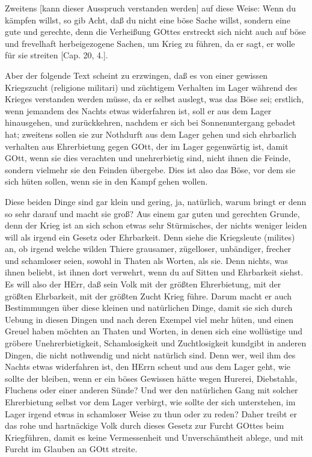 Zweitens [kann dieser Ausspruch verstanden werden] auf diese Weise: Wenn du kämpfen willst, so gib Acht, daß du nicht eine böse Sache willst, sondern eine gute und gerechte, denn die Verheißung GOttes erstreckt sich nicht auch auf böse und frevelhaft herbeigezogene Sachen, um Krieg zu führen, da er sagt, er wolle für sie streiten [Cap. 20, 4.].

Aber der folgende Text scheint zu erzwingen, daß es von einer gewissen Kriegszucht (religione militari) und züchtigem Verhalten im Lager während des Krieges verstanden werden müsse, da er selbst auslegt, was das Böse sei; erstlich, wenn jemandem des Nachts etwas widerfahren ist, soll er aus dem Lager hinausgehen, und zurückkehren, nachdem er sich bei Sonnenuntergang gebadet hat; zweitens sollen sie zur Nothdurft aus dem Lager gehen und sich ehrbarlich verhalten aus Ehrerbietung gegen GOtt, der im Lager gegenwärtig ist, damit GOtt, wenn sie dies verachten und unehrerbietig sind, nicht ihnen die Feinde, sondern vielmehr sie den Feinden übergebe. Dies ist also das Böse, vor dem sie sich hüten sollen, wenn sie in den Kampf gehen wollen.

Diese beiden Dinge sind gar klein und gering, ja, natürlich, warum bringt er denn so sehr darauf und macht sie groß? Aus einem gar guten und gerechten Grunde, denn der Krieg ist an sich schon etwas sehr Stürmisches, der nichts weniger leiden will als irgend ein Gesetz oder Ehrbarkeit. Denn siehe die Kriegsleute (milites) an, ob irgend welche wilden Thiere grausamer, zügelloser, unbändiger, frecher und schamloser seien, sowohl in Thaten als Worten, als sie. Denn nichts, was ihnen beliebt, ist ihnen dort verwehrt, wenn du auf Sitten und Ehrbarkeit siehst. Es will also der HErr, daß sein Volk mit der größten Ehrerbietung, mit der größten Ehrbarkeit, mit der größten Zucht Krieg führe. Darum macht er auch Bestimmungen über diese kleinen und natürlichen Dinge, damit sie sich durch Uebung in diesen Dingen und nach deren Exempel viel mehr hüten, und einen Greuel haben möchten an Thaten und Worten, in denen sich eine wollüstige und gröbere Unehrerbietigkeit, Schamlosigkeit und Zuchtlosigkeit kundgibt in anderen Dingen, die nicht nothwendig und nicht natürlich sind. Denn wer, weil ihm des Nachts
etwas widerfahren ist, den HErrn scheut und aus dem Lager geht, wie sollte der bleiben, wenn er ein böses Gewissen hätte wegen Hurerei, Diebstahls, Fluchens oder einer anderen Sünde? Und wer den natürlichen Gang mit solcher Ehrerbietung selbst vor dem Lager verbirgt, wie sollte der sich unterstehen, im Lager irgend etwas in schamloser Weise zu thun oder zu reden? Daher treibt er das rohe und hartnäckige Volk durch dieses Gesetz zur Furcht GOttes beim Kriegführen, damit es keine Vermessenheit und Unverschämtheit ablege, und mit Furcht im Glauben an GOtt streite.


